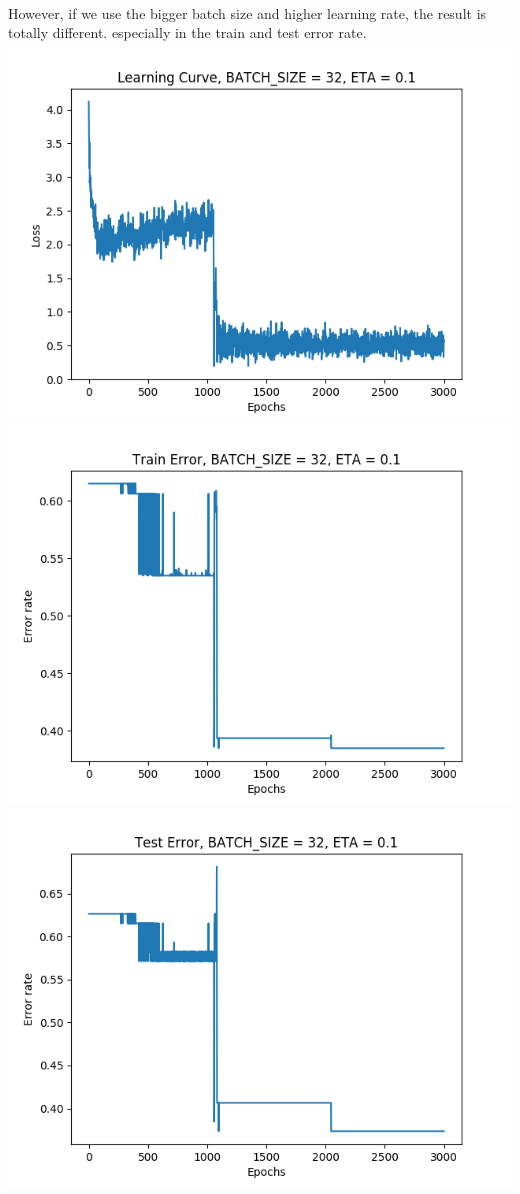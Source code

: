 \documentclass[11pt, a4paper]{article} %
\begin{document}
\\ However, if we use the bigger batch size and higher learning rate, the result is totally different. especially in the train and test error rate. 
\\ \includegraphics[scale = 0.6]{figure_2/LC_P2.png}
\\ \includegraphics[scale = 0.6]{figure_2/TRE_P2.png}
\\ \includegraphics[scale = 0.6]{figure_2/TEE_P2.png}
\end{document}
